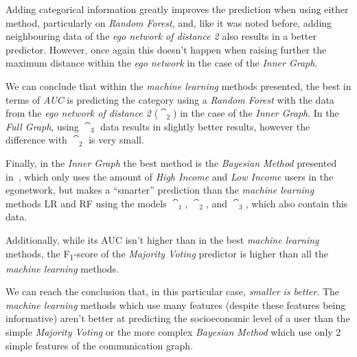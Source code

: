 Adding categorical information greatly improves the prediction when using either method, particularly on \emph{Random Forest}, and, like it was noted before, adding neighbouring data of the \emph{ego network of distance 2} also results in a better predictor. However, once again this doesn't happen when raising further the maximum distance within the \emph{ego network} in the case of the \emph{Inner Graph}.

We can conclude that within the \emph{machine learning} methods presented, the best in terms of \emph{AUC} is predicting the category using a \emph{Random Forest} with the data from the \emph{ego network of distance 2} ($\cat_2$) in the case of the \emph{Inner Graph}. In the \emph{Full Graph}, using $\cat_3$ data results in slightly better results, however the difference with $\cat_2$ is very small.

Finally, in the \emph{Inner Graph} the best method is the \emph{Bayesian Method} presented in~\cite{fixmanasonam2016}, which only uses the amount of \emph{High Income} and \emph{Low Income} users in the egonetwork, but makes a ``smarter'' prediction than the \emph{machine learning} methods LR and RF using the models $\cat_1$, $\cat_2$, and $\cat_3$, which also contain this data. 

Additionally, while its AUC isn't higher than in the best \emph{machine learning} methods, the F\textsubscript{1}-score of the \emph{Majority Voting} predictor is higher than all the \emph{machine learning} methods.

We can reach the conclusion that, in this particular case, \emph{smaller is better}. The \emph{machine learning} methods which use many features (despite these features being informative) aren't better at predicting the socioeconomic level of a user than the simple \emph{Majority Voting} or the more complex \emph{Bayesian Method} which use only 2 simple features of the communication graph.


